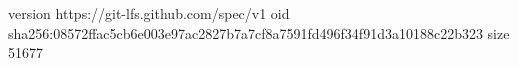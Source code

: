 version https://git-lfs.github.com/spec/v1
oid sha256:08572ffac5cb6e003e97ac2827b7a7cf8a7591fd496f34f91d3a10188c22b323
size 51677

